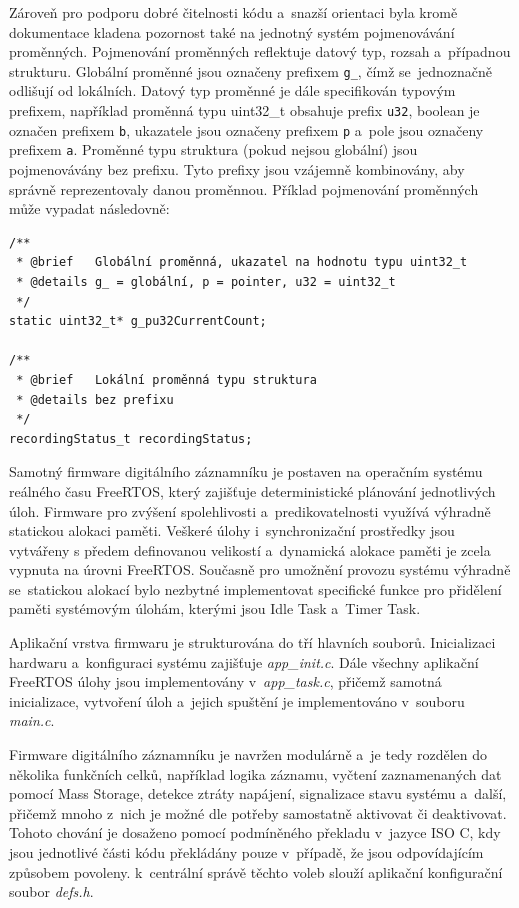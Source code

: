 Zároveň pro podporu dobré čitelnosti kódu a~snazší orientaci byla kromě dokumentace kladena pozornost také na jednotný systém pojmenovávání proměnných. Pojmenování proměnných reflektuje datový typ, rozsah a~případnou strukturu. Globální proměnné jsou označeny prefixem \texttt{g\_}, čímž se~jednoznačně odlišují od lokálních. Datový typ proměnné je dále specifikován typovým prefixem, například proměnná typu uint32\_t obsahuje prefix \texttt{u32}, boolean je označen prefixem \texttt{b}, ukazatele jsou označeny prefixem \texttt{p} a~pole jsou označeny prefixem \texttt{a}. Proměnné typu struktura (pokud nejsou globální) jsou pojmenovávány bez prefixu. Tyto prefixy jsou vzájemně kombinovány, aby správně reprezentovaly danou proměnnou. Příklad pojmenování proměnných může vypadat následovně:

\begin{verbatim}
/**
 * @brief 	Globální proměnná, ukazatel na hodnotu typu uint32_t
 * @details g_ = globální, p = pointer, u32 = uint32_t
 */
static uint32_t* g_pu32CurrentCount;

/**
 * @brief 	Lokální proměnná typu struktura
 * @details bez prefixu
 */
recordingStatus_t recordingStatus;
\end{verbatim}

\newpage

Samotný firmware digitálního záznamníku je postaven na operačním systému reálného času FreeRTOS, který zajišťuje deterministické plánování jednotlivých úloh. Firmware pro zvýšení spolehlivosti a~predikovatelnosti využívá výhradně statickou alokaci paměti. Veškeré úlohy i~synchronizační prostředky jsou vytvářeny s předem definovanou velikostí a~dynamická alokace paměti je zcela vypnuta na úrovni FreeRTOS. Současně pro umožnění provozu systému výhradně se~statickou alokací bylo nezbytné implementovat specifické funkce pro přidělení paměti systémovým úlohám, kterými jsou Idle Task a~Timer Task.~\cite{freertos_book}

Aplikační vrstva firmwaru je strukturována do tří hlavních souborů. Inicializaci hardwaru a~konfiguraci systému zajišťuje \textit{app\_init.c}. Dále všechny aplikační FreeRTOS úlohy jsou implementovány v~\textit{app\_task.c}, přičemž samotná inicializace, vytvoření úloh a~jejich spuštění je implementováno v~souboru \textit{main.c}.

Firmware digitálního záznamníku je navržen modulárně a~je tedy rozdělen do několika funkčních celků, například logika záznamu, vyčtení zaznamenaných dat pomocí Mass Storage, detekce ztráty napájení, signalizace stavu systému a~další, přičemž mnoho z~nich je možné dle potřeby samostatně aktivovat či deaktivovat. Tohoto chování je dosaženo pomocí podmíněného překladu v~jazyce ISO C, kdy jsou jednotlivé části kódu překládány pouze v~případě, že jsou odpovídajícím způsobem povoleny. k~centrální správě těchto voleb slouží aplikační konfigurační soubor \textit{defs.h}. 

